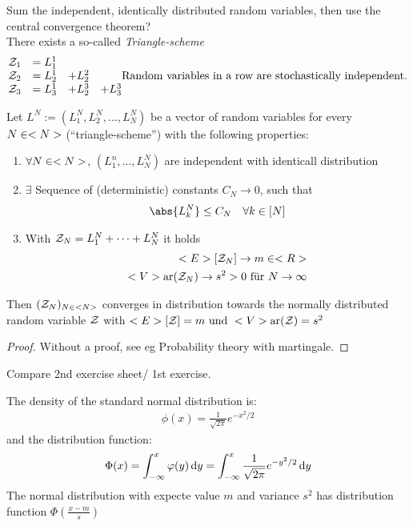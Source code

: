 Sum the independent, identically distributed random variables, then use the central convergence theorem?\\
There exists a so-called \emph{Triangle-scheme}
\begin{align*}
	\begin{matrix}
	\mathcal{Z}_1 &= L_1^1 & &\\
	\mathcal{Z}_2 &= L_2^1 &+L^2_2 &\\
	\mathcal{Z}_3 &= L_3^1 &+L^3_2 &+L^3_3\\
	\end{matrix} \text{Random variables in a row are stochastically independent.}
\end{align*}
\begin{theorem}
	Let $L^N := (L^N_1, L^N_2, \dots, L^N_N)$ be a vector of random variables for every $N \in <N>$ (``triangle-scheme'') with the following properties:
	\begin{enumerate}
		\item $\forall N \in <N>$, $(L^n_1, \dots, L_N^N)$ are independent with identicall distribution
		\item $\exists$ Sequence of (deterministic) constants $C_N \to 0$, such that
		\begin{align*}
			\abs{L_k^N} \le C_N \quad \forall k \in [N]
		\end{align*}
		\item With $\mathcal{Z}_N = L^N_1 + \dots + L^N_N$ it holds
		\begin{align*}
			<E>[\mathcal{Z}_N] \to m \in <R>\\
			<V>\text{ar}(\mathcal{Z}_N) \to s^2 > 0 \text{ für }N \to \infty
		\end{align*}
	\end{enumerate}
	Then $(\mathcal{Z}_N)_{N \in <N>}$ converges in distribution towards the normally distributed random variable $\mathcal{Z}$ with $<E>[\mathcal{Z}] = m \text{ und } <V>\text{ar}(\mathcal{Z}) = s^2$
\end{theorem}
\begin{proof}
	Without a proof, see eg Probability theory with martingale.
\end{proof}
\begin{*remark}
	Compare 2nd exercise sheet/ 1st exercise.
\end{*remark}
\begin{erinnerung} %
	The density of the standard normal distribution is:
	\begin{align*}
		\phi(x) = \frac{1}{\sqrt{2\pi}} e^{-x^2/2}
	\end{align*}
	and the distribution function:
	\begin{align*}
		\Phi(x) = \int_{-\infty}^x \varphi(y) \,\mathrm{d} y = \int_{-\infty}^x \frac{1}{\sqrt{2\pi}} e^{-y^2/2} \,\mathrm{d} y
	\end{align*}
	The normal distribution with expecte value $m$ and variance $s^2$ has distribution function $\Phi(\frac{x-m}{s})$
\end{erinnerung}
